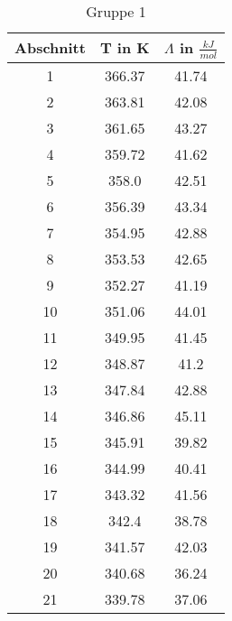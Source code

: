 \documentclass{article}
\begin{document}
\begin{table}[H]\centering
\caption{Gruppe 1}
\begin{tabular}{c|c|c}
Abschnitt&T in K&$\Lambda$ in $\frac{kJ}{mol}$\\
\hline
1&366.37&41.74\\
2&363.81&42.08\\
3&361.65&43.27\\
4&359.72&41.62\\
5&358.0&42.51\\
6&356.39&43.34\\
7&354.95&42.88\\
8&353.53&42.65\\
9&352.27&41.19\\
10&351.06&44.01\\
11&349.95&41.45\\
12&348.87&41.2\\
13&347.84&42.88\\
14&346.86&45.11\\
15&345.91&39.82\\
16&344.99&40.41\\
17&343.32&41.56\\
18&342.4&38.78\\
19&341.57&42.03\\
20&340.68&36.24\\
21&339.78&37.06\\
\end{tabular}
\end{table}
\end{document}
